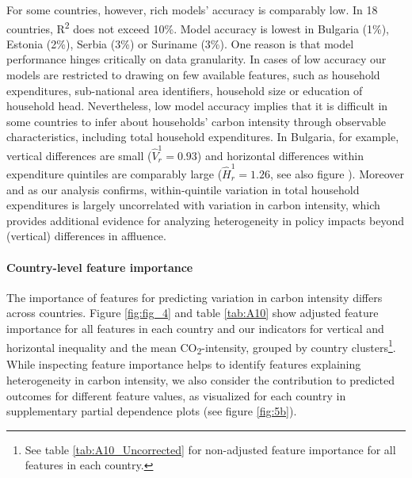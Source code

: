 \documentclass[12pt, a4paper]{article}
\begin{document}
For some countries, however, rich models' accuracy is comparably low. In 18 countries, R\textsuperscript{2} does not exceed 10\%. Model accuracy is lowest in Bulgaria (1\%), Estonia (2\%), Serbia (3\%) or Suriname (3\%). One reason is that model performance hinges critically on data granularity. In cases of low accuracy our models are restricted to drawing on few available features, such as household expenditures, sub-national area identifiers, household size or education of household head. Nevertheless, low model accuracy implies that it is difficult in some countries to infer about households' carbon intensity through observable characteristics, including total household expenditures. In Bulgaria, for example, vertical differences are small ($\widehat{V}_{r}^{1}=0.93$) and horizontal differences within expenditure quintiles are comparably large ($\widehat{H}_{r}^{1}=1.26$, see also figure ). Moreover and as our analysis confirms, within-quintile variation in total household expenditures is largely uncorrelated with variation in carbon intensity, which provides additional evidence for analyzing heterogeneity in policy impacts beyond (vertical) differences in affluence.

\paragraph{Country-level feature importance}
The importance of features for predicting variation in carbon intensity differs across countries. Figure \ref{fig:fig_4} and table \ref{tab:A10} show adjusted feature importance for all features in each country and our indicators for vertical and horizontal inequality and the mean CO\textsubscript{2}-intensity, grouped by country clusters\footnote{See table \ref{tab:A10_Uncorrected} for non-adjusted feature importance for all features in each country.}. While inspecting feature importance helps to identify features explaining heterogeneity in carbon intensity, we also consider the contribution to predicted outcomes for different feature values, as visualized for each country in supplementary partial dependence plots (see figure \ref{fig:5b}).
\end{document}
